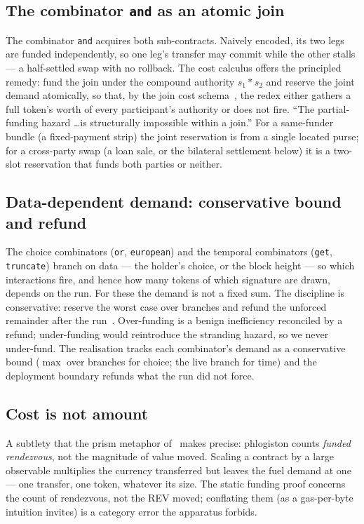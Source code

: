 \documentclass[11pt]{article}
\theoremstyle{definition}
\theoremstyle{plain}
\begin{document}
\subsection{The combinator \texttt{and} as an atomic join}

The combinator \texttt{and} acquires both sub-contracts. Naively encoded, its two legs are funded
independently, so one leg's transfer may commit while the other stalls --- a half-settled swap with
no rollback. The cost calculus offers the principled remedy: fund the join under the compound
authority $s_1 * s_2$ and reserve the joint demand atomically, so that, by the join cost
schema~\cite[\S4.8]{CAR2026}, the redex either gathers a full token's worth of every participant's
authority or does not fire. ``The partial-funding hazard \dots is structurally impossible within a
join.'' For a same-funder bundle (a fixed-payment strip) the joint reservation is from a single
located purse; for a cross-party swap (a loan sale, or the bilateral settlement below) it is a
two-slot reservation that funds both parties or neither.

\subsection{Data-dependent demand: conservative bound and refund}

The choice combinators (\texttt{or}, \texttt{european}) and the temporal combinators
(\texttt{get}, \texttt{truncate}) branch on data --- the holder's choice, or the block height ---
so which interactions fire, and hence how many tokens of which signature are drawn, depends on the
run. For these the demand is not a fixed sum. The discipline is conservative: reserve the worst case
over branches and refund the unforced remainder after the run~\cite[\S8.6]{CAR2026}. Over-funding is
a benign inefficiency reconciled by a refund; under-funding would reintroduce the stranding hazard,
so we never under-fund. The realisation tracks each combinator's demand as a conservative bound
($\max$ over branches for choice; the live branch for time) and the deployment boundary refunds what
the run did not force.

\subsection{Cost is not amount}

A subtlety that the prism metaphor of~\cite[\S5.6]{CAR2026} makes precise: phlogiston counts
\emph{funded rendezvous}, not the magnitude of value moved. Scaling a contract by a large observable
multiplies the currency transferred but leaves the fuel demand at one --- one transfer, one token,
whatever its size. The static funding proof concerns the count of rendezvous, not the REV moved;
conflating them (as a gas-per-byte intuition invites) is a category error the apparatus forbids.
\end{document}

